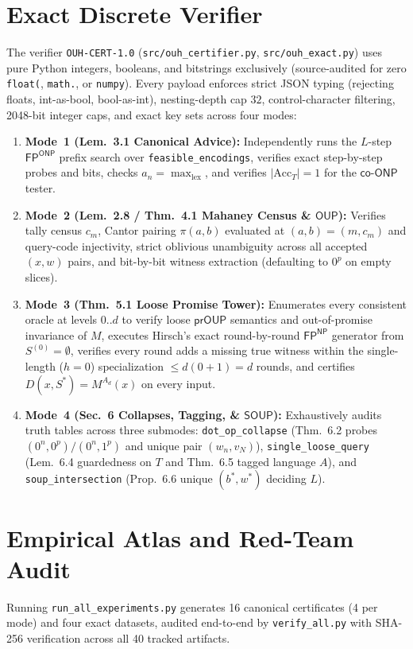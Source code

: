 \documentclass[10pt,twocolumn]{article}
\newcommand{\NP}{\mathsf{NP}}
\newcommand{\ONP}{\mathsf{ONP}}
\newcommand{\OUP}{\mathsf{OUP}}
\newcommand{\SOUP}{\mathsf{SOUP}}
\begin{document}
\section{Exact Discrete Verifier}\label{sec:cert}
The verifier \texttt{OUH-CERT-1.0} (\texttt{src/ouh\_certifier.py}, \texttt{src/ouh\_exact.py}) uses pure Python integers, booleans, and bitstrings exclusively (source-audited for zero \texttt{float(}, \texttt{math.}, or \texttt{numpy}). Every payload enforces strict JSON typing (rejecting floats, int-as-bool, bool-as-int), nesting-depth cap $32$, control-character filtering, 2048-bit integer caps, and exact key sets across four modes:
\begin{enumerate}[leftmargin=*,nosep]
  \item \textbf{Mode~1 (Lem.~3.1 Canonical Advice):} Independently runs the $L$-step $\mathsf{FP}^{\ONP}$ prefix search over \texttt{feasible\_encodings}, verifies exact step-by-step probes and bits, checks $a_n = \max_{\mathrm{lex}}$, and verifies $|\mathrm{Acc}_T| = 1$ for the $\mathsf{co}\text{-}\ONP$ tester.
  \item \textbf{Mode~2 (Lem.~2.8 / Thm.~4.1 Mahaney Census \& $\OUP$):} Verifies tally census $c_m$, Cantor pairing $\pi(a, b)$ evaluated at $(a, b) = (m, c_m)$ and query-code injectivity, strict oblivious unambiguity across all accepted $(x, w)$ pairs, and bit-by-bit witness extraction (defaulting to $0^p$ on empty slices).
  \item \textbf{Mode~3 (Thm.~5.1 Loose Promise Tower):} Enumerates every consistent oracle at levels $0..d$ to verify loose $\mathsf{prOUP}$ semantics and out-of-promise invariance of $M$, executes Hirsch's exact round-by-round $\mathsf{FP}^{\NP}$ generator from $S^{(0)} = \emptyset$, verifies every round adds a missing true witness within the single-length ($h=0$) specialization $\le d(0+1) = d$ rounds, and certifies $D(x, S^*) = M^{A_d}(x)$ on every input.
  \item \textbf{Mode~4 (Sec.~6 Collapses, Tagging, \& $\SOUP$):} Exhaustively audits truth tables across three submodes: \texttt{dot\_op\_collapse} (Thm.~6.2 probes $(0^n, 0^p)/(0^n, 1^p)$ and unique pair $(w_n, v_N)$), \texttt{single\_loose\_query} (Lem.~6.4 guardedness on $T$ and Thm.~6.5 tagged language $A$), and \texttt{soup\_intersection} (Prop.~6.6 unique $(b^*, w^*)$ deciding $L$).
\end{enumerate}

\section{Empirical Atlas and Red-Team Audit}\label{sec:results}
Running \texttt{run\_all\_experiments.py} generates 16 canonical certificates (4 per mode) and four exact datasets, audited end-to-end by \texttt{verify\_all.py} with SHA-256 verification across all 40 tracked artifacts.
\end{document}
